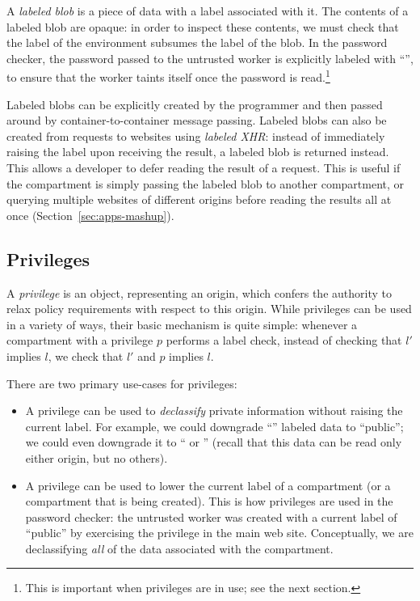 A \emph{labeled blob} is a piece of data with a label
associated with it.
%
The contents of a labeled blob are opaque: in order to
inspect these contents, we must check that the label of the environment
subsumes the label of the blob.
%
In the password checker, the password passed to the untrusted worker
is explicitly labeled with ``'', to ensure that the worker
taints itself once the password is read.\footnote{This is important
when privileges are in use; see the next section.}

Labeled blobs can be explicitly created by the programmer and then
passed around by container-to-container message passing.
%
Labeled blobs can also be created from requests to websites using
\emph{labeled XHR}: instead of immediately raising the label upon
receiving the result, a labeled blob is returned instead.
%
This allows a developer to defer reading the result of a request. This
is useful if the compartment is simply passing the labeled blob to
another compartment, or querying multiple websites of different origins
before reading the results all at once (Section~\ref{sec:apps-mashup}).


\subsection{Privileges}
\label{sec:privileges}

A \emph{privilege} is an object, representing an origin, which confers
the authority to relax policy requirements with respect to this origin.
%
While privileges can be used in a variety of ways, their basic mechanism
is quite simple:  whenever a compartment with a privilege $p$ performs a
label check, instead of checking that $l'$ implies $l$, we check that
$l'$ and $p$ implies $l$.

There are two primary use-cases for privileges:

\begin{itemize}
    \item A privilege can be used to \emph{declassify} private
        information without raising the current label.  For example, we
        could downgrade ``'' labeled data to
        ``public''; we could even downgrade it to ``
        or '' (recall that this data can be read only
        either origin, but no others).

    \item A privilege can be used to lower the current label of
        a compartment (or a compartment that is being created).
        This is how privileges are used
        in the password checker: the untrusted worker was created
        with a current label of ``public'' by exercising the
         privilege in the main web site.  Conceptually, we
        are declassifying \emph{all} of the data associated with the
        compartment.
\end{itemize}


